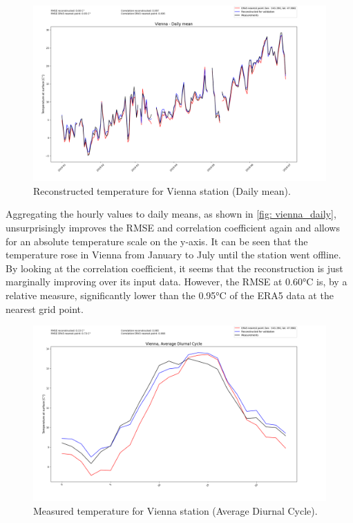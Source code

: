 \begin{figure}
\centering
\includegraphics[width=1.00\textwidth]{resources/images/charts/vienna_eval_grib_final/Vienna - Daily mean.png}
\caption{Reconstructed temperature for Vienna station (Daily mean).}
\label{fig: vienna_daily}
\end{figure}

Aggregating the hourly values to daily means, as shown in \autoref{fig: vienna_daily}, unsurprisingly improves the RMSE and correlation coefficient again and allows for an absolute temperature scale on the y-axis.
It can be seen that the temperature rose in Vienna from January to July until the station went offline.
By looking at the correlation coefficient, it seems that the reconstruction is just marginally improving over its input data.
However, the RMSE at 0.60°C is, by a relative measure, significantly lower than the 0.95°C of the ERA5 data at the nearest grid point. 

\begin{figure}
\centering
\includegraphics[width=1.00\textwidth]{resources/images/charts/vienna_eval_grib_final/Vienna, Average Diurnal Cycle.png}
\caption{Measured temperature for Vienna station (Average Diurnal Cycle).}
\label{fig: vienna_diurnal}
\end{figure}

